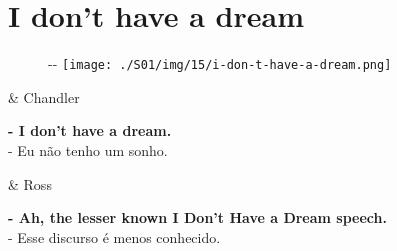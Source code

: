 \hypertarget{i-dont-have-a-dream}{%
\section{I don't have a dream}\label{i-dont-have-a-dream}}

\begin{figure}[!ht]
  \begin{adjustwidth}{-\oddsidemargin-1in}{-\rightmargin}
    \centering
    \texttt{[image: ./S01/img/15/i-don-t-have-a-dream.png]}
  \end{adjustwidth}
\end{figure}

\begin{tcolorbox}[enhanced,center upper,
    drop fuzzy shadow southeast, boxrule=0.3pt,
    lower separated=false,
    colframe=black!30!dialogoBorder,colback=white]
\begin{minipage}[c]{0.16\linewidth}
   & \centering \scriptsize{Chandler}
\end{minipage}
\hfill
\begin{minipage}[c]{0.8\linewidth}
  \textbf{- I don't have a dream.}\\
  - Eu não tenho um sonho.
\end{minipage}

\medskip
\begin{minipage}[c]{0.16\linewidth}
   & \centering \scriptsize{Ross}
\end{minipage}
\hfill
\begin{minipage}[c]{0.8\linewidth}
  \textbf{- Ah, the lesser known I Don't Have a Dream speech.}\\
  - Esse discurso é menos conhecido.
\end{minipage}
\end{tcolorbox}

